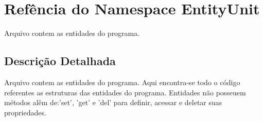 \hypertarget{namespaceEntityUnit}{\section{Refência do Namespace Entity\-Unit}
\label{namespaceEntityUnit}
}


Arquivo contem as entidades do programa.  




\subsection{Descrição Detalhada}
Arquivo contem as entidades do programa. Aqui encontra-\/se todo o código referentes as estruturas das entidades do programa. Entidades não posseuem métodos alêm de\-:'set', 'get' e 'del' para definir, acessar e deletar suas propriedades. 